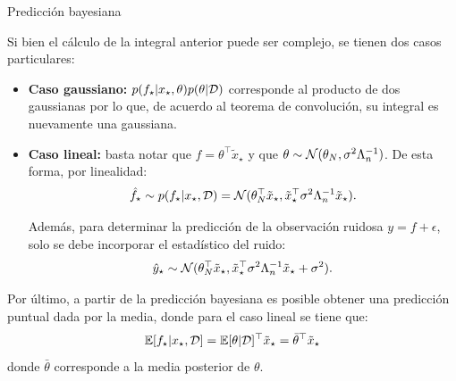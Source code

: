 \documentclass[9pt, handout]{beamer}
\begin{document}
\begin{frame}{Predicción bayesiana}

Si bien el cálculo de la integral anterior puede ser complejo, se tienen dos casos particulares:

\begin{itemize}
	\item \textbf{Caso gaussiano:} $p(f_\star|x_\star, \theta)p( \theta|{\mathcal D})$ corresponde al producto de dos gaussianas por lo que, de acuerdo al teorema de convolución, su integral es nuevamente una gaussiana.\pause
	\item \textbf{Caso lineal:} basta notar que $f = \theta^\top \tilde{x}_\star$ y que $\theta \sim {\mathcal N}(\theta_N,\sigma^2\Lambda_n^{-1})$. De esta forma, por linealidad:
\begin{equation*}
	\hat f_\star \sim p(f_\star|x_\star,{\mathcal D}) = {\mathcal N}(\theta_N^\top \tilde{x}_\star,\tilde{x}_\star^\top\sigma^2\Lambda_n^{-1} \tilde{x}_\star).
\end{equation*}\pause

Además, para determinar la predicción de la observación ruidosa $y=f+\epsilon$, solo se debe incorporar el estadístico del ruido:
\begin{equation*}
	\hat y_\star\sim{\mathcal N}(\theta_N^\top \tilde{x}_\star,\tilde{x}_\star^\top\sigma^2\Lambda_n^{-1} \tilde{x}_\star + \sigma^2).
\end{equation*}

\end{itemize}

\pause

Por último, a partir de la predicción bayesiana es posible obtener una predicción puntual dada por la media, donde para el caso lineal se tiene que:
\begin{equation*}
	\operatorname{\mathbb{E}}[f_\star|x_\star,{\mathcal D}] = \operatorname{\mathbb{E}}[\theta|{\mathcal D}]^\top  \tilde{x}_\star = \bar \theta^\top  \tilde{x}_\star
\end{equation*}
donde $\bar \theta$ corresponde a la media posterior de $\theta$.
	
\end{frame}
\end{document}
